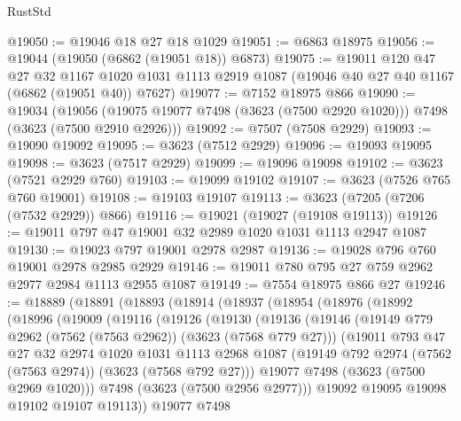 \begin{lexlean}{RustStd}
\begin{coremodule}
@19050 := @19046 @18 @27 @18 @1029
@19051 := @6863 @18975
@19056 := @19044 (@19050 (@6862 (@19051 @18)) @6873)
@19075 := @19011
    @120
    @47
    @27
    @32
    @1167
    @1020
    @1031
    @1113
    @2919
    @1087
    (@19046 @40 @27 @40 @1167 (@6862 (@19051 @40)) @7627)
@19077 := @7152 @18975 @866
@19090 := @19034
    (@19056 (@19075 @19077 @7498 (@3623 (@7500 @2920 @1020))) @7498 (@3623 (@7500 @2910 @2926)))
@19092 := @7507 (@7508 @2929)
@19093 := @19090 @19092
@19095 := @3623 (@7512 @2929)
@19096 := @19093 @19095
@19098 := @3623 (@7517 @2929)
@19099 := @19096 @19098
@19102 := @3623 (@7521 @2929 @760)
@19103 := @19099 @19102
@19107 := @3623 (@7526 @765 @760 @19001)
@19108 := @19103 @19107
@19113 := @3623 (@7205 (@7206 (@7532 @2929)) @866)
@19116 := @19021 (@19027 (@19108 @19113))
@19126 := @19011 @797 @47 @19001 @32 @2989 @1020 @1031 @1113 @2947 @1087
@19130 := @19023 @797 @19001 @2978 @2987
@19136 := @19028 @796 @760 @19001 @2978 @2985 @2929
@19146 := @19011 @780 @795 @27 @759 @2962 @2977 @2984 @1113 @2955 @1087
@19149 := @7554 @18975 @866 @27
@19246 := @18889
    (@18891
      (@18893
        (@18914
          (@18937
            (@18954
              (@18976
                (@18992
                  (@18996
                    (@19009
                      (@19116
                        (@19126
                          (@19130
                            (@19136
                              (@19146
                                (@19149 @779 @2962 (@7562 (@7563 @2962)) (@3623 (@7568 @779 @27)))
                                (@19011
                                  @793
                                  @47
                                  @27
                                  @32
                                  @2974
                                  @1020
                                  @1031
                                  @1113
                                  @2968
                                  @1087
                                  (@19149 @792 @2974 (@7562 (@7563 @2974)) (@3623 (@7568 @792 @27)))
                                  @19077
                                  @7498
                                  (@3623 (@7500 @2969 @1020)))
                                @7498
                                (@3623 (@7500 @2956 @2977)))
                              @19092
                              @19095
                              @19098
                              @19102
                              @19107
                              @19113))
                          @19077
                          @7498

\end{coremodule}
\end{lexlean}
